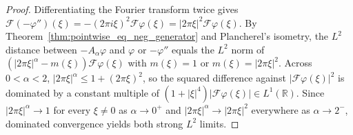 \begin{proof}
\leanok
Differentiating the Fourier transform twice gives $\mathcal{F}(-\varphi'')(\xi) = -(2\pi i \xi)^2 \mathcal{F}\varphi(\xi) = \lvert 2\pi\xi \rvert^2 \mathcal{F}\varphi(\xi)$. By Theorem~\ref{thm:pointwise_eq_neg_generator} and Plancherel's isometry, the $L^2$ distance between $-A_\alpha \varphi$ and $\varphi$ or $-\varphi''$ equals the $L^2$ norm of $(\lvert 2\pi\xi \rvert^\alpha - m(\xi))\mathcal{F}\varphi(\xi)$ with $m(\xi) = 1$ or $m(\xi) = \lvert 2\pi\xi \rvert^2$. Across $0 < \alpha < 2$, $\lvert 2\pi\xi \rvert^\alpha \le 1 + (2\pi\xi)^2$, so the squared difference against $\lvert \mathcal{F}\varphi(\xi) \rvert^2$ is dominated by a constant multiple of $(1 + \lvert \xi \rvert^4)\lvert \mathcal{F}\varphi(\xi) \rvert \in L^1(\mathbb{R})$. Since $\lvert 2\pi\xi \rvert^\alpha \to 1$ for every $\xi \neq 0$ as $\alpha \to 0^+$ and $\lvert 2\pi\xi \rvert^\alpha \to \lvert 2\pi\xi \rvert^2$ everywhere as $\alpha \to 2^-$, dominated convergence yields both strong $L^2$ limits.
\end{proof}
